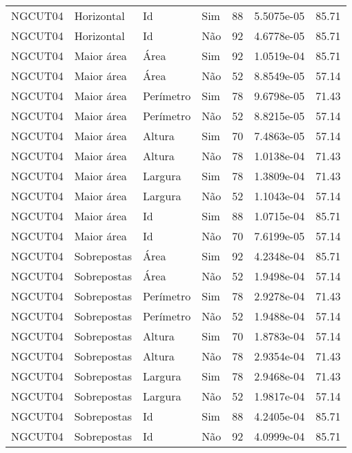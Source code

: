 \begin{tabular}{llllrrr}
    NGCUT04   & Horizontal  & Id        & Sim         & 88           & 5.5075e-05 & 85.71    \\
    NGCUT04   & Horizontal  & Id        & Não         & 92           & 4.6778e-05 & 85.71    \\
    NGCUT04   & Maior área  & Área      & Sim         & 92           & 1.0519e-04 & 85.71    \\
    NGCUT04   & Maior área  & Área      & Não         & 52           & 8.8549e-05 & 57.14    \\
    NGCUT04   & Maior área  & Perímetro & Sim         & 78           & 9.6798e-05 & 71.43    \\
    NGCUT04   & Maior área  & Perímetro & Não         & 52           & 8.8215e-05 & 57.14    \\
    NGCUT04   & Maior área  & Altura    & Sim         & 70           & 7.4863e-05 & 57.14    \\
    NGCUT04   & Maior área  & Altura    & Não         & 78           & 1.0138e-04 & 71.43    \\
    NGCUT04   & Maior área  & Largura   & Sim         & 78           & 1.3809e-04 & 71.43    \\
    NGCUT04   & Maior área  & Largura   & Não         & 52           & 1.1043e-04 & 57.14    \\
    NGCUT04   & Maior área  & Id        & Sim         & 88           & 1.0715e-04 & 85.71    \\
    NGCUT04   & Maior área  & Id        & Não         & 70           & 7.6199e-05 & 57.14    \\
    NGCUT04   & Sobrepostas & Área      & Sim         & 92           & 4.2348e-04 & 85.71    \\
    NGCUT04   & Sobrepostas & Área      & Não         & 52           & 1.9498e-04 & 57.14    \\
    NGCUT04   & Sobrepostas & Perímetro & Sim         & 78           & 2.9278e-04 & 71.43    \\
    NGCUT04   & Sobrepostas & Perímetro & Não         & 52           & 1.9488e-04 & 57.14    \\
    NGCUT04   & Sobrepostas & Altura    & Sim         & 70           & 1.8783e-04 & 57.14    \\
    NGCUT04   & Sobrepostas & Altura    & Não         & 78           & 2.9354e-04 & 71.43    \\
    NGCUT04   & Sobrepostas & Largura   & Sim         & 78           & 2.9468e-04 & 71.43    \\
    NGCUT04   & Sobrepostas & Largura   & Não         & 52           & 1.9817e-04 & 57.14    \\
    NGCUT04   & Sobrepostas & Id        & Sim         & 88           & 4.2405e-04 & 85.71    \\
    NGCUT04   & Sobrepostas & Id        & Não         & 92           & 4.0999e-04 & 85.71    \\
    \hline
\end{tabular}